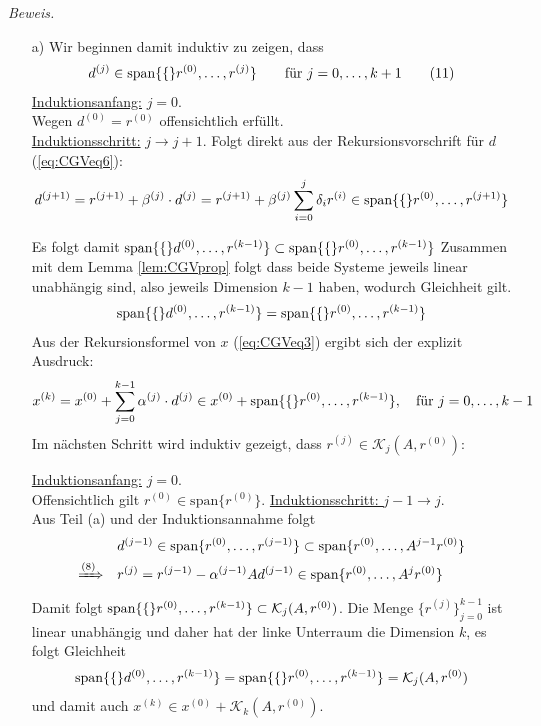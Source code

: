 \textit{Beweis.} 
\begin{enumerate}
  \item[a)] Wir beginnen damit induktiv zu zeigen, dass 
  \begin{align*}
    d^{(j)}\in\text{span}\{\{\}r^{(0)}, \dots, r^{(j)}\} \qquad \text{für } j=0,\dots,k+1 
    \tag{11}\label{eq:CGVeq11}
  \end{align*}
  \underline{Induktionsanfang:} $j=0$. \\
  Wegen $d^{(0)}=r^{(0)}$ offensichtlich erfüllt.  \\
  \underline{Induktionsschritt:} $j\rightarrow j+1$. Folgt direkt aus der Rekursionsvorschrift für $d$ 
  (\ref{eq:CGVeq6}):
  \begin{align*}
    d^{(j+1)} 
    = r^{(j+1)} + \beta^{(j)}\cdot d^{(j)} 
    = r^{(j+1)} + \beta^{(j)}\sum_{i=0}^{j}\delta_i r^{(i)}
    \in \text{span}\{\{\}r^{(0)}, \dots, r^{(j+1)}\}
  \end{align*}

  Es folgt damit $\text{span}\{\{\}d^{(0)}, \dots, r^{(k-1)}\}\subset\text{span}\{\{\}r^{(0)}, \dots, r^{(k-1)}\}$
  Zusammen mit dem Lemma \ref{lem:CGVprop} folgt dass beide Systeme jeweils linear unabhängig sind, also jeweils 
  Dimension $k-1$ haben, wodurch Gleichheit gilt.
  \begin{align*}
    \text{span}\{\{\}d^{(0)}, \dots, r^{(k-1)}\} = \text{span}\{\{\}r^{(0)}, \dots, r^{(k-1)}\}
  \end{align*}
  Aus der Rekursionsformel von $x$ (\ref{eq:CGVeq3}) ergibt sich der explizit Ausdruck:
  \begin{align*}
    x^{(k)} 
    = x^{(0)} + \sum_{j=0}^{k-1} \alpha^{(j)}\cdot d^{(j)} 
    \in x^{(0)} + \text{span}\{\{\}r^{(0)}, \dots, r^{(k-1)}\},
    \quad\text{für } j=0,\dots,k-1
  \end{align*}
  Im nächsten Schritt wird induktiv gezeigt, dass $r^{(j)}\in \mathcal{K}_j(A,r^{(0)})$: 

  \underline{Induktionsanfang:} $j=0$. \\
  Offensichtlich gilt $r^{(0)}\in\text{span}\{r^{(0)}\}$.
  \underline{Induktionsschritt: } $j-1\rightarrow j$.\\
  Aus Teil (a) und der Induktionsannahme folgt 
  \begin{align*}
  & d^{(j-1)}\in\text{span}\{r^{(0)}, \dots, r^{(j-1)}\}
  \subset \text{span}\{r^{(0)}, \dots, A^{j-1}r^{(0)}\} \\
  \xRightarrow{(8)} \quad
  & r^{(j)} = r^{(j-1)}-\alpha^{(j-1)}Ad^{(j-1)}
  \in \text{span}\{r^{(0)}, \dots, A^{j}r^{(0)}\}
  \end{align*}
  Damit folgt $\text{span}\{\{\}r^{(0)},\dots,r^{(k-1)}\}\subset \mathcal{K}_j(A,r^{(0)})$. 
  Die Menge $\{r^{(j)}\}_{j=0}^{k-1}$ ist linear unabhängig und daher hat der linke Unterraum die Dimension $k$, 
  es folgt Gleichheit 
  \begin{align*}
      \text{span}\{\{\}d^{(0)}, \dots, r^{(k-1)}\} = \text{span}\{\{\}r^{(0)}, \dots, r^{(k-1)}\} = \mathcal{K}_j(A,r^{(0)})
  \end{align*}
  und damit auch $x^{(k)}\in x^{(0)} + \mathcal{K}_k(A,r^{(0)})$.


\end{enumerate}
